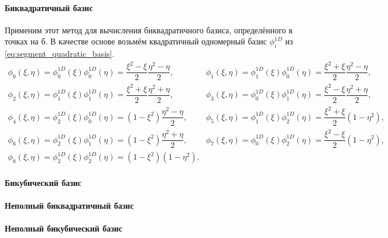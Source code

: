 \paragraph{Биквадратичный базис}
Применим этот метод для вычисления биквадратичного базиса, определённого в точках на б.
В качестве основе возьмём квадратичный одномерный базис $\phi^{1D}_i$ из \cref{eq:segment_quadratic_basis}.
\begin{equation}
\label{eq:quadrangle_quadratic_basis}
\begin{array}{ll}
  \phi_0(\xi, \eta) = \phi_0^{1D}(\xi)\phi_0^{1D}(\eta) = \dfrac{\xi^2 - \xi}{2}\dfrac{\eta^2 - \eta}{2},
& \phi_1(\xi, \eta) = \phi_1^{1D}(\xi)\phi_0^{1D}(\eta) = \dfrac{\xi^2 + \xi}{2}\dfrac{\eta^2 - \eta}{2}, \\[10pt]
  \phi_2(\xi, \eta) = \phi_1^{1D}(\xi)\phi_1^{1D}(\eta) = \dfrac{\xi^2 + \xi}{2}\dfrac{\eta^2 + \eta}{2},
& \phi_3(\xi, \eta) = \phi_0^{1D}(\xi)\phi_1^{1D}(\eta) = \dfrac{\xi^2 - \xi}{2}\dfrac{\eta^2 + \eta}{2}, \\[10pt]
  \phi_4(\xi, \eta) = \phi_2^{1D}(\xi)\phi_0^{1D}(\eta) = (1-\xi^2)\dfrac{\eta^2 - \eta}{2},
& \phi_5(\xi, \eta) = \phi_1^{1D}(\xi)\phi_2^{1D}(\eta) = \dfrac{\xi^2 + \xi}{2}(1 - \eta^2),            \\[10pt]
  \phi_6(\xi, \eta) = \phi_2^{1D}(\xi)\phi_1^{1D}(\eta) = (1-\xi^2)\dfrac{\eta^2 + \eta}{2},
& \phi_7(\xi, \eta) = \phi_0^{1D}(\xi)\phi_2^{1D}(\eta) = \dfrac{\xi^2 - \xi}{2}(1 - \eta^2),            \\[10pt]
  \phi_8(\xi, \eta) = \phi_2^{1D}(\xi)\phi_2^{1D}(\eta) = (1-\xi^2)(1 - \eta^2).
&
\end{array}
\end{equation}

\paragraph{Бикубический базис}

\paragraph{Неполный биквадратичный базис}

\paragraph{Неполный бикубический базис}
